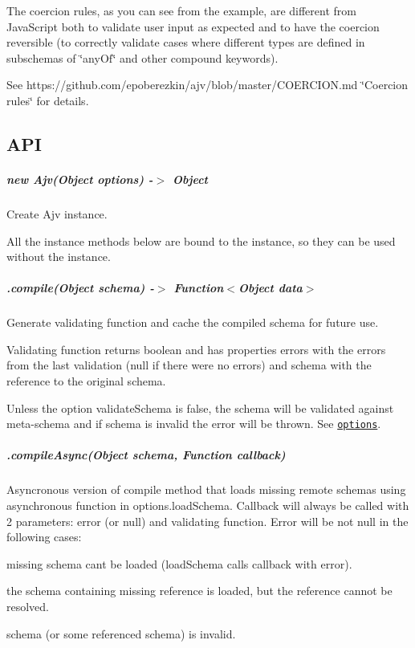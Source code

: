 The coercion rules, as you can see from the example, are different from Java\+Script both to validate user input as expected and to have the coercion reversible (to correctly validate cases where different types are defined in subschemas of \char`\"{}any\+Of\char`\"{} and other compound keywords).

See https\+://github.com/epoberezkin/ajv/blob/master/\+C\+O\+E\+R\+C\+I\+O\+N.\+md \char`\"{}\+Coercion rules\char`\"{} for details.

\subsection*{A\+PI}

\subparagraph*{new Ajv(\+Object options) -\/$>$ Object}

Create Ajv instance.

All the instance methods below are bound to the instance, so they can be used without the instance.

\subparagraph*{.compile(\+Object schema) -\/$>$ Function$<$Object data$>$}

Generate validating function and cache the compiled schema for future use.

Validating function returns boolean and has properties {\ttfamily errors} with the errors from the last validation ({\ttfamily null} if there were no errors) and {\ttfamily schema} with the reference to the original schema.

Unless the option {\ttfamily validate\+Schema} is false, the schema will be validated against meta-\/schema and if schema is invalid the error will be thrown. See \href{#options}{\tt options}.

\subparagraph*{.compile\+Async(\+Object schema, Function callback)}

Asyncronous version of {\ttfamily compile} method that loads missing remote schemas using asynchronous function in {\ttfamily options.\+load\+Schema}. Callback will always be called with 2 parameters\+: error (or null) and validating function. Error will be not null in the following cases\+:


\begin{DoxyItemize}
\item missing schema can\textquotesingle{}t be loaded ({\ttfamily load\+Schema} calls callback with error).
\item the schema containing missing reference is loaded, but the reference cannot be resolved.
\item schema (or some referenced schema) is invalid.
\end{DoxyItemize}

